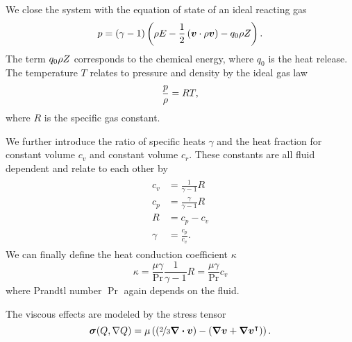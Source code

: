 We close the system with the equation of state of an ideal reacting gas
\begin{equation}
  \label{eq:eos}
  p = (\gamma - 1) \left(\rho E - \frac{1}{2} \left(\bm{v} \cdot \rho \bm{v} \right)  - q_0 \rho Z \right).
\end{equation}
The term $q_0 \rho Z$ corresponds to the chemical energy, where $q_0$ is the heat release.
The temperature $T$ relates to pressure and density by the ideal gas law
\begin{equation}
  \label{eq:temperature}
 \frac{p}{\rho} = RT,
\end{equation}
where $R$ is the specific gas constant.

We further introduce the ratio of specific heats $\gamma$ and the heat fraction for constant volume $c_v$ and constant volume $c_r$.
These constants are all fluid dependent and relate to each other by
\begin{align}
  \label{eq:fluid-constants}
  \begin{split}
  c_v &= \frac{1}{\gamma - 1} R \\
  c_p &= \frac{\gamma}{\gamma - 1} R\\
  R &= c_p - c_v\\
  \gamma &= \frac{c_p}{c_v}.
  \end{split}
\end{align}
We can finally define the heat conduction coefficient $\kappa$
\begin{equation}
  \label{eq:heat-conduction-coeff}
  \kappa = \frac{\mu \gamma}{\Pr} \frac{1}{\gamma - 1} R = \frac{\mu \gamma}{\Pr} c_v
\end{equation}
where Prandtl number $\Pr$ again depends on the fluid.


The viscous effects are modeled by the stress tensor
\begin{equation}
  \label{eq:stress-tensor}
  \stressT(Q, \nabla Q) =
  \mu
  \left(
  \left(\nicefrac{2}{3} \divergence{\Qv} \right) -
  \left( \gradient{\Qv} + \gradient{\Qv}^\intercal \right)
  \right).
\end{equation}

